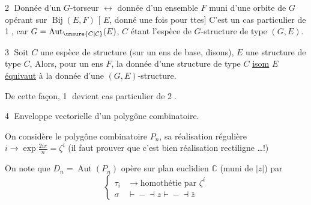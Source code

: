 \textcircled{2} Donnée d'un $G$-torseur  $\longleftrightarrow$ donnée d'un ensemble $F$ muni d'une orbite de $G$ opérant sur $\operatorname{Bij}(E,F)$
[ $E$,  donné une fois pour ttes] C'est un cas particulier de \textcircled{1}, car $G=\operatorname{Aut}_{\unsure{C|\mathcal C}}(E)$, $C$ étant l'espèce de $G$-structure de type $(G,E)$.

\textcircled{3} Soit $C$ une espèce de structure (sur un ens de base, disons), $E$ une structure de type $C$,  Alors, pour un ens $F$, la donnée d'une structure de type $C$ \uline{isom}  $E$ \uline{équivaut} à la donnée d'une $(G,E)$-structure.

De cette façon, \textcircled{1} devient cas particulier de \textcircled{2}.

\textcircled{4} Enveloppe vectorielle d'un polygône combinatoire.

On considère le polygône  combinatoire  \deleted{$\unsure{[1,n]|[1,n[}$\unsure{,}} $P_n$, sa réalisation  régulière  $i\longrightarrow\exp\frac{2i\pi}{n}=\zeta^i$ (il faut prouver que c'est bien  réalisation rectiligne \ldots !)

On note que $D_n=\operatorname{Aut}(P_n)$ opère sur   plan euclidien  $\mathbb{C}$ (muni de $|z|$) par 
\[
\left\{\begin{aligned}
\tau_i &\longrightarrow \text{homothétie par }\zeta^i\\
\sigma &\mathrel{\vdash\!\!-\!\dashv} z\mathrel{\vdash\!\!-\!\dashv}\bar z
\end{aligned}\right.
\]
